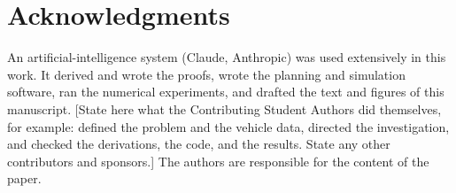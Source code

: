 \documentclass[10pt,letterpaper]{article}
\theoremstyle{aiaa}
\begin{document}
\section*{Acknowledgments}
An artificial-intelligence system (Claude, Anthropic) was used extensively in this work. It derived and wrote the proofs,
wrote the planning and simulation software, ran the numerical experiments, and drafted the text and figures of this
manuscript. [State here what the Contributing Student Authors did themselves, for example: defined the problem and the
vehicle data, directed the investigation, and checked the derivations, the code, and the results. State any other
contributors and sponsors.] The authors are responsible for the content of the paper.
\end{document}

